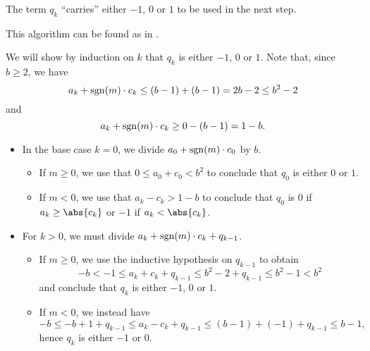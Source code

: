 \begin{comments}
  \item The term \( q_k \) \enquote{carries} either \( -1 \), \( 0 \) or \( 1 \) to be used in the next step.
  \item This algorithm can be found as  in \cite{notebook:code}.
\end{comments}
\begin{defproof}
   We will show by induction on \( k \) that \( q_k \) is either \( -1 \), \( 0 \) or \( 1 \). Note that, since \( b \geq 2 \), we have
  \begin{equation*}
    a_k + \operatorname{sgn}(m) \cdot c_k \leq (b - 1) + (b - 1) = 2b - 2 \leq b^2 - 2
  \end{equation*}
  and
  \begin{equation*}
    a_k + \operatorname{sgn}(m) \cdot c_k \geq 0 - (b - 1) = 1 - b.
  \end{equation*}

  \begin{itemize}
    \item In the base case \( k = 0 \), we divide \( a_0 + \operatorname{sgn}(m) \cdot c_0 \) by \( b \).
    \begin{itemize}
      \item If \( m \geq 0 \), we use that \( 0 \leq a_0 + c_0 < b^2 \) to conclude that \( q_0 \) is either \( 0 \) or \( 1 \).
      \item If \( m < 0 \), we use that \( a_k - c_k > 1 - b \) to conclude that \( q_0 \) is \( 0 \) if \( a_k \geq \abs{c_k} \) or \( -1 \) if \( a_k < \abs{c_k} \).
    \end{itemize}

    \item For \( k > 0 \), we must divide \( a_k + \operatorname{sgn}(m) \cdot c_k + q_{k-1} \).
    \begin{itemize}
      \item If \( m \geq 0 \), we use the inductive hypothesis on \( q_{k-1} \) to obtain
      \begin{equation*}
        -b < -1 \leq a_k + c_k + q_{k-1} \leq b^2 - 2 + q_{k-1} \leq b^2 - 1 < b^2
      \end{equation*}
      and conclude that \( q_k \) is either \( -1 \), \( 0 \) or \( 1 \).

      \item If \( m < 0 \), we instead have
      \begin{equation*}
        -b \leq -b + 1 + q_{k-1} \leq a_k - c_k + q_{k-1} \leq (b - 1) + (-1) + q_{k-1} \leq b - 1,
      \end{equation*}
      hence \( q_k \) is either \( -1 \) or \( 0 \).
    \end{itemize}
  \end{itemize}


\end{defproof}
